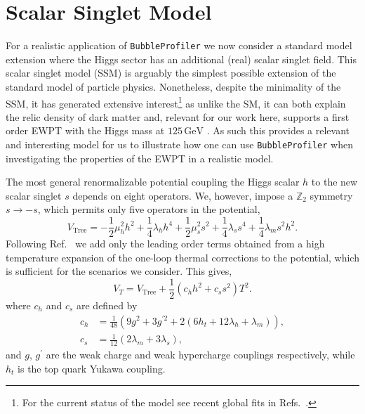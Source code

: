 \documentclass[final,3p,11pt,pdflatex]{elsarticle}
\makeatletter
\newcommand{\bp}{\texttt{BubbleProfiler}\@\xspace}
\newcommand{\refcite}[1]{Ref.~\cite{#1}}
\makeatother
\begin{document}
\section{Scalar Singlet Model}
\label{sec:ssm}
For a realistic application of \bp we now consider a standard
model extension where the Higgs sector has an additional (real) scalar
singlet field.  This scalar singlet model (SSM) is arguably the
simplest possible extension of the standard model of particle
physics. Nonetheless, despite the minimality of the SSM, it has
generated extensive interest\footnote{For the current status of the
  model see recent global fits in
  Refs.\ \cite{Athron:2017kgt,Athron:2018ipf}.} as unlike the SM, it
can both explain the relic density of dark matter
\cite{McDonaldGaugesingletscalars1994,
  BurgessMinimalModelnonbaryonic2001} and, relevant for our work here,
 supports a first order EWPT with the Higgs mass at
$125\,\text{GeV}$
\cite{KurupDynamicselectroweakphase2017,ClineElectroweakbaryogenesisdark2013,Vaskonen:2016yiu}.
As such this provides a relevant and interesting model for us to
illustrate how one can use \bp when investigating the properties of
the EWPT in a realistic model. %

The most general renormalizable potential coupling the Higgs scalar
$h$ to the new scalar singlet $s$ depends on eight operators.  We,
however, impose a $\mathbb{Z}_2$ symmetry $s\rightarrow -s$, which
permits only five operators in the potential,
\begin{equation}
V_\text{Tree} = -\frac{1}{2}\mu_h^2 h^2 + \frac{1}{4}\lambda_h h^4 + \frac{1}{2}\mu_s^2 s^2 + \frac{1}{4} \lambda_s s^4 + \frac{1}{4} \lambda_m s^2 h^2.
\end{equation}
Following \refcite{EspinosaStrongElectroweakPhase2012} we add only
the leading order terms obtained from a high temperature expansion of
the one-loop thermal corrections to the potential, which is
sufficient for the scenarios we consider.  This gives,
%
\begin{equation}
V_T = V_\text{Tree} + \frac{1}{2}(c_h h^2 + c_s s^2) T^2.
\end{equation}
%
where $c_h$ and $c_s$ are defined by
%
\begin{align}
c_h &= \frac{1}{48}(9g^2 + 3g^{\prime 2} + 2(6 h_t + 12 \lambda_h + \lambda_m)), \label{eq:c_h} \\
c_s &= \frac{1}{12}(2 \lambda_m + 3 \lambda_s), \label{eq:c_s}
\end{align}
%
and $g$, $g^{\prime}$ are the weak charge and weak hypercharge
couplings respectively, while $h_t$ is the top quark Yukawa coupling.
\end{document}
